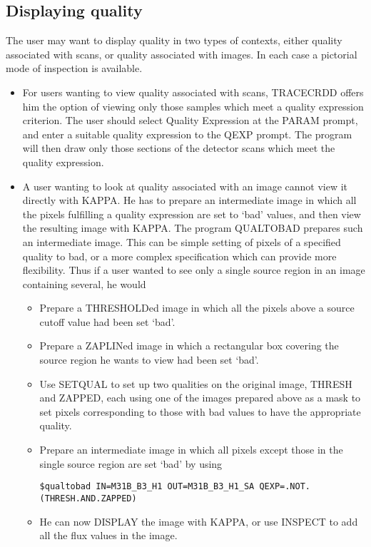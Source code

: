 \documentclass[twoside,11pt]{article}
\begin{document}
\subsection{Displaying quality}
The user may want to display quality in two types of contexts, either quality
associated with scans, or quality associated with images. In each case a
pictorial mode of inspection is available.
\begin{itemize}
\item For users wanting to view quality associated with scans, TRACECRDD offers 
him the option of viewing only those samples which meet a quality expression 
criterion. The user should select Quality Expression at the PARAM prompt, and
enter a suitable quality expression to the QEXP prompt. The program will then 
draw only those sections of the detector scans which meet the quality 
expression.
\item A user wanting to look at quality associated with an image cannot view it
directly with KAPPA. He has to prepare an intermediate image in which all the
pixels fulfilling a quality expression are set to `bad' values, and
then view the resulting image with KAPPA. The program QUALTOBAD prepares such an
intermediate image. This can be simple setting of pixels of a specified quality
to bad, or a more complex specification which can provide more flexibility. Thus
if a user wanted to see only a single source region in an image containing
several, he would
\begin{itemize}
\item Prepare a THRESHOLDed image in which all the pixels above a source cutoff
value had been set `bad'.
\item Prepare a ZAPLINed image in which a rectangular box covering the source 
region he wants to view had been set `bad'.
\item Use SETQUAL to set up two qualities on the original image, THRESH and 
ZAPPED, each using one of the images prepared above as a mask to set pixels 
corresponding to those with bad values to have the appropriate quality.
\item Prepare an intermediate image in which all pixels except those in the 
single source region are set `bad'  by using
\begin{small}
\begin{verbatim}
$qualtobad IN=M31B_B3_H1 OUT=M31B_B3_H1_SA QEXP=.NOT.(THRESH.AND.ZAPPED)
\end{verbatim}
\end{small}
\item He can now DISPLAY the image with KAPPA, or use INSPECT to add all the 
flux values in the image.
\end{itemize}
\end{itemize}
\end{document}
